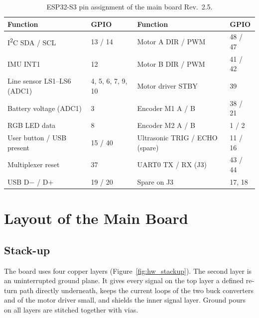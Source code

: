 \begin{otherlanguage}{english}
\begin{table}[htbp]
  \centering\small
  \caption{ESP32-S3 pin assignment of the main board Rev.~2.5.}
  \label{tab:hw_pins}
  \begin{tabular}{@{}ll@{\hspace{2em}}ll@{}}
    \toprule
    \textbf{Function} & \textbf{GPIO} & \textbf{Function} & \textbf{GPIO} \\
    \midrule
    I\textsuperscript{2}C SDA / SCL & 13 / 14 & Motor A DIR / PWM & 48 / 47 \\
    IMU INT1 & 12 & Motor B DIR / PWM & 41 / 42 \\
    Line sensor LS1--LS6 (ADC1) & 4, 5, 6, 7, 9, 10 & Motor driver STBY & 39 \\
    Battery voltage (ADC1) & 3 & Encoder M1 A / B & 38 / 21 \\
    RGB LED data & 8 & Encoder M2 A / B & 1 / 2 \\
    User button / USB present & 15 / 40 & Ultrasonic TRIG / ECHO (spare) & 11 / 16 \\
    Multiplexer reset & 37 & UART0 TX / RX (J3) & 43 / 44 \\
    USB D$-$ / D$+$ & 19 / 20 & Spare on J3 & 17, 18 \\
    \bottomrule
  \end{tabular}
\end{table}

\section{Layout of the Main Board}
\label{sec:hw_layout}

\subsection{Stack-up}
The board uses four copper layers (Figure~\ref{fig:hw_stackup}). The second layer is an uninterrupted
ground plane. It gives every signal on the top layer a defined return path directly underneath, keeps the
current loops of the two buck converters and of the motor driver small, and shields the inner signal layer.
Ground pours on all layers are stitched together with vias.


\end{otherlanguage}
